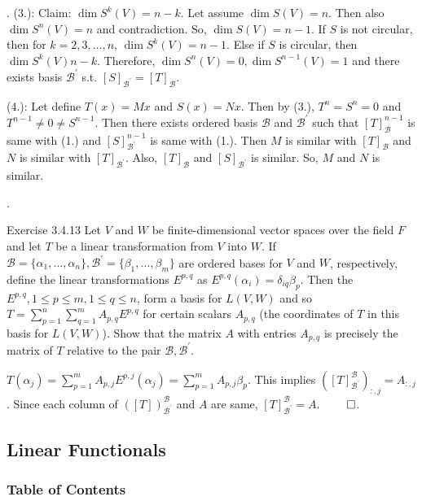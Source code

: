 \documentclass[8pt]{beamer}
\newcommand{\mc}[1]{\mathcal{#1}}
\begin{document}
\begin{frame}{.}
    (3.): Claim: $\dim S^k(V) = n-k$.
    Let assume $\dim S(V) = n$. Then also $\dim S^n(V) = n$ and contradiction.
    So, $\dim S(V) = n-1$.
    If $S$ is not circular, then for $k=2, 3, \dots, n$, $\dim S^k(V) = n-1$.
    Else if $S$ is circular, then $\dim S^k(V) n-k$.
    Therefore, $\dim S^n(V)=0, \dim S^{n-1}(V) = 1$ and there exists basis $\mc{B}^\prime$ s.t. $[S]_{\mc{B}^\prime} = [T]_{\mc{B}}$.


    (4.): Let define $T(x) = Mx$ and $S(x) =Nx$.
    Then by (3.), $T^n = S^n = 0$ and $T^{n-1} \neq 0 \neq S^{n-1}$.
    Then there exists ordered basis $\mc{B}$ and $\mc{B}^\prime$ such that $[T]_{\mc{B}}^{n-1}$ is same with (1.) and $[S]_{\mc{B}^\prime}^{n-1}$ is same with (1.).
    Then $M$ is similar with $[T]_{\mc{B}}$ and $N$ is similar with $[T]_{\mc{B}^\prime}$.
    Also, $[T]_{\mc{B}}$ and $[S]_{\mc{B}^\prime}$ is similar.
    So, $M$ and $N$ is similar.
\end{frame}

\begin{frame}{.}
    \begin{block}{Exercise 3.4.13}
        Let $V$ and $W$ be finite-dimensional vector spaces over the field $F$ and let $T$ be a linear transformation from $V$ into $W$.
        If $\mc{B} = \{\alpha_1, \dots, \alpha_n\}, \mc{B}^\prime = \{\beta_1, \dots, \beta_m\}$ are ordered bases for $V$ and $W$, respectively, define the linear transformations $E^{p,q}$ as $E^{p,q}(\alpha_i) = \delta_{iq} \beta_p$.
        Then the $E^{p,q}, 1 \leq p \leq m, 1 \leq q \leq n$, form a basis for $L(V,W)$ and so $T = \sum_{p=1}^n \sum_{q=1}^m A_{p,q} E^{p,q}$ for certain scalars $A_{p,q}$ (the coordinates of $T$ in this basis for $L(V,W)$).
        Show that the matrix $A$ with entries $A_{p,q}$ is precisely the matrix of $T$ relative to the pair $\mc{B}, \mc{B}^\prime$.
    \end{block}

    $T(\alpha_j) = \sum_{p=1}^m A_{p,j} E^{p,j}(\alpha_j) = \sum_{p=1}^m A_{p,j} \beta_p$.
    This implies $([T]^{\mc{B}}_{\mc{B}^\prime})_{:, j} = A_{:, j}$.
    Since each column of $([T])_{\mc{B}^\prime}^{\mc{B}}$ and $A$ are same, $[T]_{\mc{B}^\prime}^{\mc{B}} = A$.
    $\qed$.
\end{frame}

\subsection{Linear Functionals}
\begingroup
    \begin{frame}
        \frametitle{Table of Contents}
        \tableofcontents[currentsubsection]
    \end{frame}
\endgroup
\end{document}
